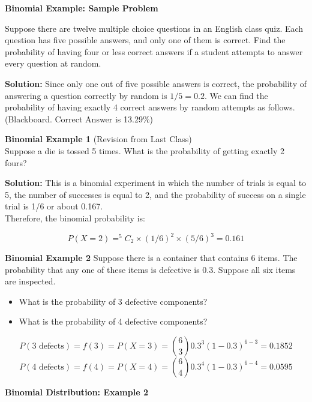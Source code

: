 {%


\item \textbf{Binomial Example: Sample Problem}

Suppose there are twelve multiple choice questions in an English class quiz. Each question has five possible answers, and only one of them is correct. Find the probability of having four or less correct answers if a student attempts to answer every question at random.



\textbf{Solution:}
Since only one out of five possible answers is correct, the probability of answering a question correctly by random is $1/5=0.2$. We can find the probability of having exactly 4 correct answers by random attempts as follows.(Blackboard. Correct Answer is 13.29\%)


\item \textbf{ Binomial Example 1 }
(Revision from Last Class)\\
Suppose a die is tossed 5 times. What is the probability of getting exactly 2 fours?

\textbf{Solution:} This is a binomial experiment in which the number of trials is equal to 5, the number of successes is equal to 2, and the probability of success on a single trial is 1/6 or about 0.167. 
\\
\bigskip
Therefore, the binomial probability is:

\[P(X=2) = ^5C_2 \times (1/6)^2 \times (5/6)^3 = 0.161\]

\textbf{ Binomial Example 2 }
Suppose there is a container that contains 6 items.  The probability that any one of these items is defective is 0.3. Suppose all six items are inspected. 
\begin{itemize}
\item What is the probability of 3 defective components?
\item What is the probability of 4 defective components?
\end{itemize}

\[ P(3\text{ defects}) = f(3) = P(X = 3) = {6\choose 3}0.3^3 (1-0.3)^{6-3} = 0.1852 \]
\[ P(4\text{ defects}) = f(4) = P(X = 4) = {6\choose 4}0.3^4 (1-0.3)^{6-4} = 0.0595 \]


\item \textbf{Binomial Distribution: Example 2}

}
